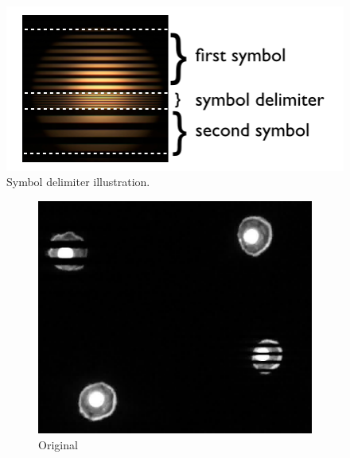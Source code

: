 \begin{figure}[!t]
  \centering
  \includegraphics[scale=0.4]{pic/symbol_delimiter.png} 
  \caption{Symbol delimiter illustration.}
  \label{fig:FD}
\end{figure}

\begin{figure}[!t]
   \centering
   \begin{subfigure}[h]{0.16\textwidth}
      \includegraphics[width=\textwidth]{pic/bbox/bbox_A_original_crop.png}
      \caption{Original} \label{fig:bbox_ori}
   \end{subfigure}%
   ~
   \begin{subfigure}[h]{0.16\textwidth}

\end{subfigure}
\end{figure}
